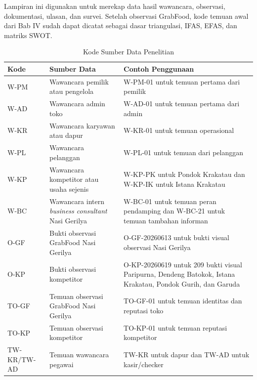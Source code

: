 \label{app:template-koding-tematik}

Lampiran ini digunakan untuk merekap data hasil wawancara, observasi, dokumentasi, ulasan, dan survei. Setelah observasi GrabFood, kode temuan awal dari Bab IV sudah dapat dicatat sebagai dasar triangulasi, IFAS, EFAS, dan matriks SWOT.

\begin{table}[!htbp]
    \centering
    \caption{Kode Sumber Data Penelitian}
    \label{tab:kode-sumber-data-penelitian}
    \footnotesize
    \setlength{\tabcolsep}{4pt}
    \renewcommand{\arraystretch}{0.95}
    \begin{tabularx}{\textwidth}{|Z{2.2cm}|Y|Y|}
        \toprule
        \textbf{Kode} & \textbf{Sumber Data} & \textbf{Contoh Penggunaan} \\ \hline
        \midrule
        W-PM & Wawancara pemilik atau pengelola & W-PM-01 untuk temuan pertama dari pemilik \\ \hline
        W-AD & Wawancara admin toko & W-AD-01 untuk temuan pertama dari admin \\ \hline
        W-KR & Wawancara karyawan atau dapur & W-KR-01 untuk temuan operasional \\ \hline
        W-PL & Wawancara pelanggan & W-PL-01 untuk temuan dari pelanggan \\ \hline
        W-KP & Wawancara kompetitor atau usaha sejenis & W-KP-PK untuk Pondok Krakatau dan W-KP-IK untuk Istana Krakatau \\ \hline
        W-BC & Wawancara intern \textit{business consultant} Nasi Gerilya & W-BC-01 untuk temuan peran pendamping dan W-BC-21 untuk temuan tambahan informan \\ \hline
        O-GF & Bukti observasi GrabFood Nasi Gerilya & O-GF-20260613 untuk bukti visual observasi Nasi Gerilya \\ \hline
        O-KP & Bukti observasi kompetitor & O-KP-20260619 untuk 209 bukti visual Paripurna, Dendeng Batokok, Istana Krakatau, Pondok Gurih, dan Garuda \\ \hline
        TO-GF & Temuan observasi GrabFood Nasi Gerilya & TO-GF-01 untuk temuan identitas dan reputasi toko \\ \hline
        TO-KP & Temuan observasi kompetitor & TO-KP-01 untuk temuan reputasi kompetitor \\ \hline
        TW-KR/TW-AD & Temuan wawancara pegawai & TW-KR untuk dapur dan TW-AD untuk kasir/checker \\ \hline

\end{tabularx}
\end{table}
